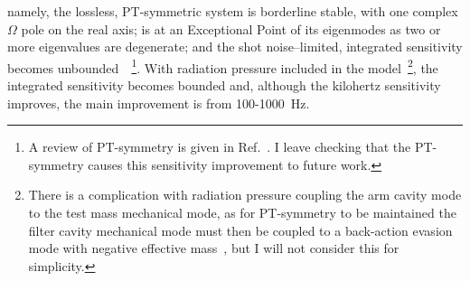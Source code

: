 namely, the lossless, PT-symmetric system is borderline stable, with one complex $\Omega$ pole on the real axis; is at an Exceptional Point of its eigenmodes as two or more eigenvalues are degenerate; and the shot noise--limited, integrated sensitivity becomes unbounded~\cite{liBroadbandSensitivityImprovement2020}~\footnote{A review of PT-symmetry is given in Ref.~\cite{el2018non}. I leave checking that the PT-symmetry causes this sensitivity improvement to future work.}. With radiation pressure included in the model~\footnote{There is a complication with radiation pressure coupling the arm cavity mode to the test mass mechanical mode, as for PT-symmetry to be maintained the filter cavity mechanical mode must then be coupled to a back-action evasion mode with negative effective mass~\cite{liBroadbandSensitivityImprovement2020}, but I will not consider this for simplicity.}, the integrated sensitivity becomes bounded and, although the kilohertz sensitivity improves, the main improvement is from 100-1000~Hz. %



